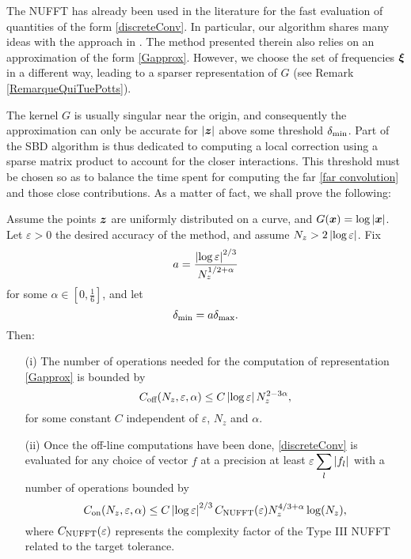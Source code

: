 \documentclass[11pt,a4paper]{article}
\begin{document}
The NUFFT has already been used in the literature for the fast evaluation of quantities of the form \eqref{discreteConv}. In particular, our algorithm shares many ideas with the approach in \cite{potts2004fast}. The method presented therein also relies on an approximation of the form \eqref{Gapprox}. However, we choose the set of frequencies $\boldsymbol{\xi}$ in a different way, leading to a sparser representation of $G$ (see Remark \autoref{RemarqueQuiTuePotts}). 
 
The kernel $G$ is usually singular near the origin, and consequently the approximation can only be accurate for $|\boldsymbol{z}|$ above some threshold $\delta_{\min}$. Part of the SBD algorithm is thus dedicated to computing a local correction using a sparse matrix product to account for the closer interactions. This threshold must be chosen so as to balance the time spent for computing the far \eqref{far convolution} and those close contributions. As a matter of fact, we shall prove the following:

\begin{The} Assume the points $\boldsymbol{z}$ are uniformly distributed on a curve, and $G(\boldsymbol{x}) = \log \left\lvert \boldsymbol{x} \right\rvert$. Let $\varepsilon > 0$ the desired accuracy of the method, and assume $N_z > 2\left\lvert \log{\varepsilon} \right\rvert$. Fix 
	\[a =\dfrac{\left\lvert \log\varepsilon \right\rvert^{2/3}}{N_z^{1/2+ \alpha}}\]
	for some $\alpha \in \left[0,\frac{1}{6}\right]$, and let 
	\[\delta_{\min} = a \delta_{\max}.\] 
	Then:
	\label{The:GlobalComplexity}
	\begin{itemize}
		\item[(i)]  The number of operations needed for the computation of representation \eqref{Gapprox} is bounded by
		      \[ C_{\textup{off}}(N_z,\varepsilon,\alpha) \leq C \left\lvert \log \varepsilon \right\rvert N_z^{2 - 3\alpha},\]
		      for some constant $C$ independent of $\varepsilon$, $N_z$ and $\alpha$. 
		\item[(ii)] Once the off-line computations have been done, \eqref{discreteConv} is evaluated for any choice of vector $f$ at a precision at least $\varepsilon \displaystyle\sum_l \left\lvert f_l \right\rvert$ with a number of operations bounded by
		      \[C_{\textup{on}}(N_z,\varepsilon,\alpha) \leq C \left\lvert \log\varepsilon \right\rvert^{2/3} C_{\textup{NUFFT}}(\varepsilon) N_z ^{4/3 + \alpha} \log(N_z),\] 
		      where $C_{\textup{NUFFT}}(\varepsilon)$ represents the complexity factor of the Type III \textup{NUFFT} related to the target tolerance. 
	\end{itemize} 
\end{The}
\end{document}
